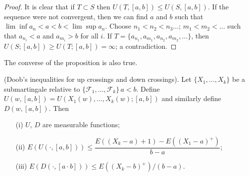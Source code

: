 \begin{proof}
It is clear that if $T\subset S$ then $U(T,[a,b])\leq U(S,[a,b])$. If
the sequence were not convergent, then we can find $a$ and $b$ such
that $\lim\inf a_{n}<a<b<\lim\sup a_{n}$. Choose
$n_{1}<n_{2}<n_{3}\ldots$; $m_{1}<m_{2}<\ldots$ such that
$a_{n_{i}}<a$ and $a_{m_{i}}>b$ for all $i$. If
$T=\{a_{n_{1}},a_{m_{1}},a_{n_{2}},a_{m_{2}},\ldots\}$, then
$U(S;[a,b])\geq U(T;[a,b])=\infty$; a contradiction.
\end{proof}

\begin{remark*}
The converse of the proposition is also true.
\end{remark*}

\begin{theorem*}
(Doob's inequalities for up crossings and down crossings). Let
  $\{X_{1},\ldots,X_{k}\}$ be a submartingale relative to
  $\{\mathscr{F}_{1},\ldots,\mathscr{F}_{k}\}\,a<b$. Define
  $U(w,[a,b])=U(X_{1}(w),\ldots,X_{k}(w);[a, b])$ and similarly
  define $D(w,[a,b])$. Then
\begin{itemize}
\item[\rm(i)] $U$, $D$ are measurable functions;

\item[\rm(ii)] $E(U(\cdot,[a,b]))\leq
  \dfrac{E((X_{k}-a)+1)-E((X_{1}-a)^{+})}{b-a}$; 

\item[\rm(iii)] $E(D(\cdot,[a\cdot b]))\leq E((X_{k}-b)^{+})/(b-a)$.
\end{itemize}
\end{theorem*}

